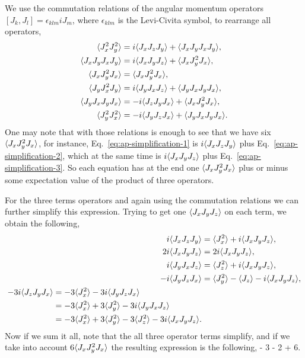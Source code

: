 We use the commutation relations of the angular momentum operators $[J_k,J_l]=\epsilon_{klm} iJ_m$, where $\epsilon_{klm}$ is the Levi-Civita symbol, to rearrange all operators,
\begin{subequations}
\begin{align}
  \langle{J_x^2J_y^2}\rangle & = i\langle{J_xJ_zJ_y}\rangle+\langle{J_xJ_yJ_xJ_y}\rangle,
  \label{eq:ap-simplification-1} \\
  \langle{J_xJ_yJ_xJ_y}\rangle & = i\langle{J_xJ_yJ_z}\rangle+\langle{J_xJ_y^2J_x}\rangle,
  \label{eq:ap-simplification-2} \\
  \langle{J_xJ_y^2J_x}\rangle & = \langle{J_xJ_y^2J_x}\rangle,
  \label{eq:ap-simplification-3} \\
  \langle{J_yJ_x^2J_y}\rangle & = i\langle{J_yJ_xJ_z}\rangle + \langle{J_yJ_xJ_yJ_x}\rangle,
  \label{eq:ap-simplification-4} \\
  \langle{J_yJ_xJ_yJ_x}\rangle & = -i\langle{J_zJ_yJ_x}\rangle + \langle{J_xJ_y^2J_x}\rangle,
  \label{eq:ap-simplification-5} \\
  \langle{J_y^2J_x^2}\rangle & = -i\langle{J_yJ_zJ_x}\rangle + \langle{J_yJ_xJ_yJ_x}\rangle.
  \label{eq:ap-simplification-6}
\end{align}
\end{subequations}
One may note that with those relations is enough to see that we have six $\langle{J_xJ_y^2J_x}\rangle$, for instance, Eq.~\eqref{eq:ap-simplification-1} is $i\langle{J_xJ_zJ_y}\rangle$ plus Eq.~\eqref{eq:ap-simplification-2}, which at the same time is $i\langle{J_xJ_yJ_z}\rangle$ plus Eq.~\eqref{eq:ap-simplification-3}.
So each equation has at the end one $\langle{J_xJ_y^2J_x}\rangle$ plus or minus some expectation value of the product of three operators.

For the three terms operators and again using the commutation relations we can further simplify this expression. Trying to get one $\langle{J_xJ_yJ_z}\rangle$ on each term, we obtain the following,
\begin{subequations}
\begin{align}
  i\langle{J_xJ_zJ_y}\rangle & = \langle{J_x^2}\rangle+i\langle{J_xJ_yJ_z}\rangle,
  \label{eq:ap-last-terms-1} \\
  2i\langle{J_xJ_yJ_z}\rangle & = 2i\langle{J_xJ_yJ_z}\rangle,
  \label{eq:ap-last-term-2} \\
  i\langle{J_yJ_xJ_z}\rangle & = \langle{J_z^2}\rangle+i\langle{J_xJ_yJ_z}\rangle,
  \label{eq:ap-simplification-3} \\
  -i\langle{J_yJ_zJ_x}\rangle & = \langle{J_y^2}\rangle - \langle{J_z}\rangle - i\langle{J_xJ_yJ_z}\rangle, \\
\begin{split}
  -3i\langle{J_zJ_yJ_x}\rangle & = -3\langle{J_x^2}\rangle - 3i \langle{J_yJ_zJ_x}\rangle \\
  & = -3\langle{J_x^2}\rangle + 3 \langle{J_y^2}\rangle - 3i\langle{J_yJ_xJ_z}\rangle \\
  & = -3\langle{J_x^2}\rangle + 3 \langle{J_y^2}\rangle - 3\langle{J_z^2}\rangle
   - 3i \langle{J_xJ_yJ_z}\rangle.
  \label{eq:ap-simplification-4}
\end{split}
\end{align}
\end{subequations}
Now if we sum it all, note that the all three operator terms simplify, and if we take into account $6\langle{J_xJ_y^2J_x}\rangle$ the resulting expression is the following,
 - 3  - 2 + 6.
\ee

